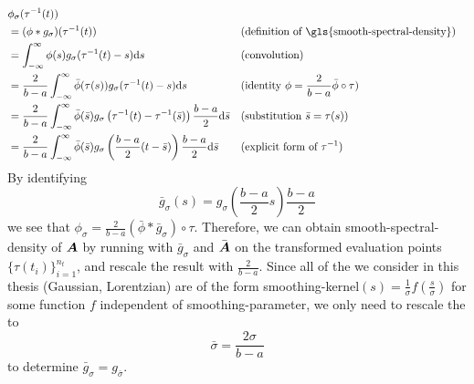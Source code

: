 \begin{align*}
    &\phi_{\sigma}(\tau^{-1}(t)) \notag \\
    &= (\phi \ast g_{\sigma})(\tau^{-1}(t)) && \text{(definition of \gls{smooth-spectral-density})} \notag \\
    &= \int_{-\infty}^{\infty} \phi(s) g_{\sigma}(\tau^{-1}(t)-s) \mathrm{d}s && \text{(convolution)} \notag \\
    &= \frac{2}{b-a}\int_{-\infty}^{\infty} \bar{\phi}(\tau(s)) g_{\sigma}(\tau^{-1}(t)-s) \mathrm{d}s && \text{(identity $\phi = \frac{2}{b-a}\bar{\phi} \circ \tau$)} \notag \\
    &= \frac{2}{b-a}\int_{-\infty}^{\infty} \bar{\phi}(\bar{s}) g_{\sigma}\left(\tau^{-1}(t)-\tau^{-1}(\bar{s})\right) \frac{b-a}{2} \mathrm{d}\bar{s} && \text{(substitution $\bar{s} = \tau(s)$)} \notag \\
    &= \frac{2}{b-a}\int_{-\infty}^{\infty} \bar{\phi}(\bar{s}) g_{\sigma}\left(\frac{b-a}{2}(t - \bar{s})\right) \frac{b-a}{2} \mathrm{d}\bar{s} && \text{(explicit form of $\tau^{-1}$)}
\end{align*}
By identifying
\begin{equation}
    \bar{g}_{\sigma}(s) = g_{\sigma}\left(\frac{b-a}{2}s\right) \frac{b-a}{2}
\end{equation}
we see that $\phi_{\sigma}= \frac{2}{b-a}(\bar{\phi} \ast \bar{g}_{\sigma}) \circ \tau$.
Therefore, we can obtain \gls{smooth-spectral-density} of $\boldsymbol{A}$ by running
 with $\bar{g}_{\sigma}$
and $\bar{\boldsymbol{A}}$ on the transformed evaluation points $\{ \tau(t_i) \}_{i=1}^{n_t}$,
and rescale the result with $\frac{2}{b-a}$.
Since all of the  we consider in this thesis (Gaussian, Lorentzian) are of the form
\gls{smoothing-kernel}$(s)=\frac{1}{\sigma}f(\frac{s}{\sigma})$ for some function $f$ independent of
\gls{smoothing-parameter}, we only need to rescale the  to
\begin{equation}
    \bar{\sigma} = \frac{2\sigma}{b - a}
    \label{equ:A-appendix-sigma-transformation}
\end{equation}
to determine $\bar{g}_{\sigma}=g_{\bar{\sigma}}$.\\
